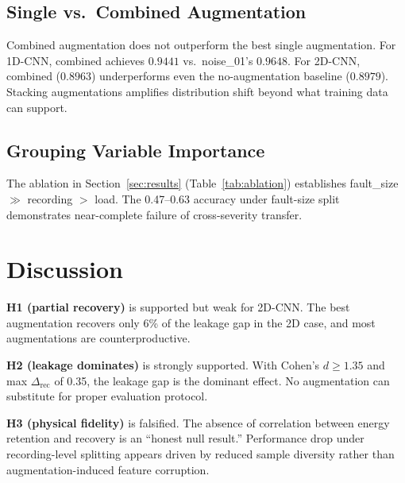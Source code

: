﻿\documentclass[11pt,a4paper]{article}
\begin{document}
\subsection{Single vs.\ Combined Augmentation}

Combined augmentation does not outperform the best single augmentation. For 1D-CNN, combined achieves $0.9441$ vs.\ noise\_01's $0.9648$. For 2D-CNN, combined ($0.8963$) underperforms even the no-augmentation baseline ($0.8979$). Stacking augmentations amplifies distribution shift beyond what training data can support.

\subsection{Grouping Variable Importance}

The ablation in Section~\ref{sec:results} (Table~\ref{tab:ablation}) establishes fault\_size $\gg$ recording $>$ load. The 0.47--0.63 accuracy under fault-size split demonstrates near-complete failure of cross-severity transfer.

\section{Discussion}

\textbf{H1 (partial recovery)} is supported but weak for 2D-CNN. The best augmentation recovers only 6\% of the leakage gap in the 2D case, and most augmentations are counterproductive.

\textbf{H2 (leakage dominates)} is strongly supported. With Cohen's $d \geq 1.35$ and max $\Delta_{\text{rec}}$ of 0.35, the leakage gap is the dominant effect. No augmentation can substitute for proper evaluation protocol.

\textbf{H3 (physical fidelity)} is falsified. The absence of correlation between energy retention and recovery is an ``honest null result.'' Performance drop under recording-level splitting appears driven by reduced sample diversity rather than augmentation-induced feature corruption.
\end{document}
